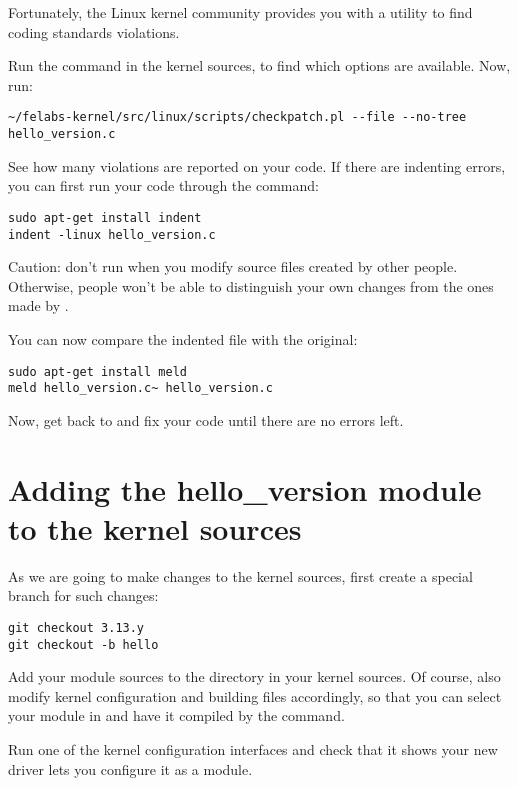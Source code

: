 Fortunately, the Linux kernel community provides you with a utility to
find coding standards violations.

Run the  command in the kernel sources,
to find which options are available.  Now, run:

\begin{verbatim}
~/felabs-kernel/src/linux/scripts/checkpatch.pl --file --no-tree hello_version.c
\end{verbatim}

See how many violations are reported on your code. If there are
indenting errors, you can first run your code through the 
command:

\begin{verbatim}
sudo apt-get install indent
indent -linux hello_version.c
\end{verbatim}

Caution: don't run  when you modify source files created
by other people. Otherwise, people won't be able to distinguish your own
changes from the ones made by .

You can now compare the indented file with the original:

\begin{verbatim}
sudo apt-get install meld
meld hello_version.c~ hello_version.c
\end{verbatim}

Now, get back to  and fix your code until there are
no errors left.

\section{Adding the hello\_version module to the kernel sources}

As we are going to make changes to the kernel sources, first create a
special branch for such changes:

\begin{verbatim}
git checkout 3.13.y
git checkout -b hello
\end{verbatim}

Add your module sources to the  directory in your
kernel sources. Of course, also modify kernel configuration and
building files accordingly, so that you can select your module in
 and have it compiled by the  command.

Run one of the kernel configuration interfaces and check that it
shows your new driver lets you configure it as a module.


